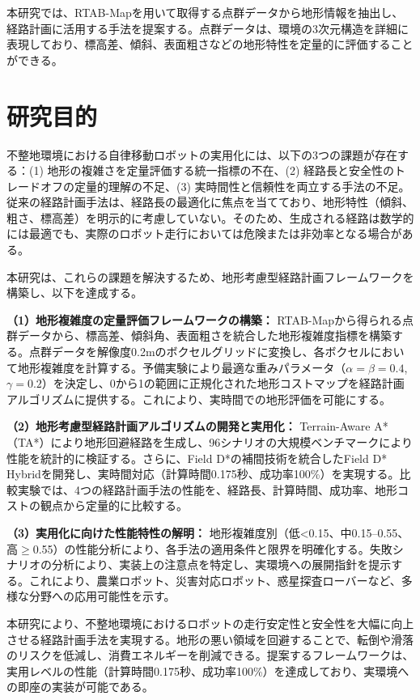 本研究では、RTAB-Mapを用いて取得する点群データから地形情報を抽出し、経路計画に活用する手法を提案する。点群データは、環境の3次元構造を詳細に表現しており、標高差、傾斜、表面粗さなどの地形特性を定量的に評価することができる。

\section{研究目的}

不整地環境における自律移動ロボットの実用化には、以下の3つの課題が存在する：(1) 地形の複雑さを定量評価する統一指標の不在、(2) 経路長と安全性のトレードオフの定量的理解の不足、(3) 実時間性と信頼性を両立する手法の不足。従来の経路計画手法は、経路長の最適化に焦点を当てており、地形特性（傾斜、粗さ、標高差）を明示的に考慮していない。そのため、生成される経路は数学的には最適でも、実際のロボット走行においては危険または非効率となる場合がある。

本研究は、これらの課題を解決するため、地形考慮型経路計画フレームワークを構築し、以下を達成する。

\textbf{（1）地形複雑度の定量評価フレームワークの構築：}
RTAB-Mapから得られる点群データから、標高差、傾斜角、表面粗さを統合した地形複雑度指標を構築する。点群データを解像度0.2mのボクセルグリッドに変換し、各ボクセルにおいて地形複雑度を計算する。予備実験により最適な重みパラメータ（$\alpha=\beta=0.4$, $\gamma=0.2$）を決定し、0から1の範囲に正規化された地形コストマップを経路計画アルゴリズムに提供する。これにより、実時間での地形評価を可能にする。

\textbf{（2）地形考慮型経路計画アルゴリズムの開発と実用化：}
Terrain-Aware A*（TA*）により地形回避経路を生成し、96シナリオの大規模ベンチマークにより性能を統計的に検証する。さらに、Field D*の補間技術を統合したField D* Hybridを開発し、実時間対応（計算時間0.175秒、成功率100\%）を実現する。比較実験では、4つの経路計画手法の性能を、経路長、計算時間、成功率、地形コストの観点から定量的に比較する。

\textbf{（3）実用化に向けた性能特性の解明：}
地形複雑度別（低<0.15、中0.15--0.55、高$\geq$0.55）の性能分析により、各手法の適用条件と限界を明確化する。失敗シナリオの分析により、実装上の注意点を特定し、実環境への展開指針を提示する。これにより、農業ロボット、災害対応ロボット、惑星探査ローバーなど、多様な分野への応用可能性を示す。

本研究により、不整地環境におけるロボットの走行安定性と安全性を大幅に向上させる経路計画手法を実現する。地形の悪い領域を回避することで、転倒や滑落のリスクを低減し、消費エネルギーを削減できる。提案するフレームワークは、実用レベルの性能（計算時間0.175秒、成功率100\%）を達成しており、実環境への即座の実装が可能である。

